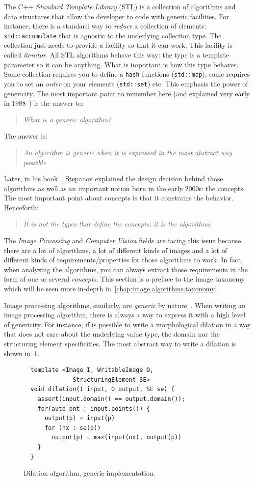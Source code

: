 The C++ \emph{Standard Template Library} (STL) is a collection of algorithms and data structures that allow the
developer to code with generic facilities. For instance, there is a standard way to \emph{reduce} a collection of
elements: \texttt{std::accumulate} that is agnostic to the underlying collection type. The collection just needs to
provide a facility so that it can work. This facility is called \emph{iterator}. All STL algorithms behave this way: the
type is a template parameter so it can be anything. What is important is how this type behaves. Some collection requires
you to define a \texttt{hash} functions (\texttt{std::map}), some requires you to set an \emph{order} on your elements
(\texttt{std::set}) etc. This emphasis the power of genericity. The most important point to remember here (and explained
very early in 1988~\cite{musser.1988.generic}) is the answer to: \blockquote{\emph{What is a generic algorithm?}}. The
answer is: \blockquote{\emph{An algorithm is generic when it is expressed in the most abstract way possible}}. Later, in
his book~\cite{stepanov.2009.elements}, Stepanov explained the design decision behind those algorithms as well as an
important notion born in the early 2000s: the concepts. The most important point about concepts is that it constrains
the behavior. Henceforth: \blockquote{\emph{It is not the types that define the concepts: it is the algorithms}}. The
\emph{Image Processing} and \emph{Computer Vision} fields are facing this issue because there are a lot of algorithms, a
lot of different kinds of images and a lot of different kinds of requirements/properties for those algorithms to work.
In fact, when analyzing the algorithms, you can always extract those requirements in the form of one or several
\emph{concepts}. This section is a preface to the image taxonomy which will be seen more in-depth
in~\cref{chap:image.algorithms.taxonomy}.

Image processing algorithms, similarly, are \emph{generic} by
nature~\cite{ritter.1990.cvgi,geraud.2000.icpr,darbon.2002.ismm,levillain.2010.icip,levillain.2014.ciarp}. When writing
an image processing algorithm, there is always a way to express it with a high level of genericity. For instance, if is
possible to write a morphological dilation in a way that does not care about the underlying value type, the domain nor
the structuring element specificities. The most abstract way to write a dilation is shown in~\ref{code:gen.dilate}.

\begin{figure}[tbh]
  \centering
  \begin{verbatim}
  template <Image I, WritableImage O,
              StructuringElement SE>
  void dilation(I input, O output, SE se) {
    assert(input.domain() == output.domain());
    for(auto pnt : input.points()) {
      output(p) = input(p)
      for (nx : se(p))
        output(p) = max(input(nx), output(p))
    }
  }
  \end{verbatim}
  \caption{Dilation algorithm, generic implementation.}
  \label{code:gen.dilate}
\end{figure}

